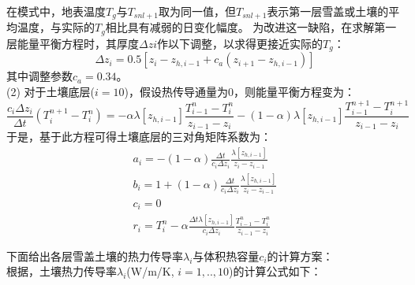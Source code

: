 在模式中，地表温度$T_g$与$T_{snl+1}$取为同一值，但$T_{snl+1}$表示第一层雪盖或土壤的平均温度，与实际的$T_g$相比具有减弱的日变化幅度。
为改进这一缺陷，在求解第一层能量平衡方程时，其厚度$\Delta zi$作以下调整，以求得更接近实际的$T_g$：
\begin{equation}
\Delta z_{i}=0.5\left[z_{i}-z_{h, i-1}+c_{a}\left(z_{i+1}-z_{h, i-1}\right)\right]
\end{equation}
其中调整参数$c_a=0.34$。\\
(2) 对于土壤底层($i=10$)，假设热传导通量为0，则能量平衡方程变为：
\begin{equation}
\frac{c_{i} \Delta z_{i}}{\Delta t}\left(T_{i}^{n+1}-T_{i}^{n}\right)=-\alpha \lambda\left[z_{h, i-1}\right] \frac{T_{i-1}^{n}-T_{i}^{n}}{z_{i-1}-z_{i}}-(1-\alpha) \lambda\left[z_{h, i-1}\right] \frac{T_{i-1}^{n+1}-T_{i}^{n+1}}{z_{i-1}-z_{i}}
\end{equation}
于是，基于此方程可得土壤底层的三对角矩阵系数为：
\begin{equation}
\begin{array}{c}a_{i}=-(1-\alpha) \frac{\Delta t}{c_{i} \Delta z_{i}} \frac{\lambda\left[z_{h, i-1}\right]}{z_{i}-z_{i-1}} \\ b_{i}=1+(1-\alpha) \frac{\Delta t}{c_{i} \Delta z_{i}} \frac{\lambda\left[z_{h, i-1}\right]}{z_{i}-z_{i-1}} \\ c_{i}=0 \\ r_{i}=T_{i}^{n}-\alpha \frac{\Delta t \lambda\left[z_{h, i-1}\right]}{c_{i} \Delta z_{i}} \frac{T_{i-1}^{n}-T_{i}^{n}}{z_{i-1}-z_{i}}\end{array}
\end{equation}



下面给出各层雪盖土壤的热力传导率$\lambda_i$与体积热容量$c_i$的计算方案：\\

根据\citet{farouki1981thermal}，土壤热力传导率$\lambda_i$(W/m/K, $i=1,..,10$)的计算公式如下：

